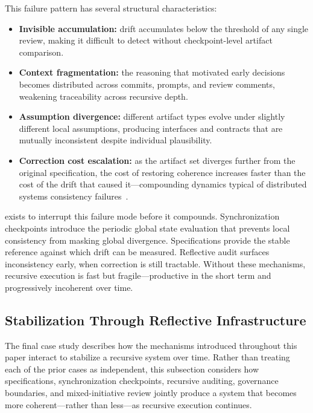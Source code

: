 This failure pattern has several structural characteristics:
\begin{itemize}
  \item \textbf{Invisible accumulation:} drift accumulates below the threshold of any single review, making it difficult to detect without checkpoint-level artifact comparison.
  \item \textbf{Context fragmentation:} the reasoning that motivated early decisions becomes distributed across commits, prompts, and review comments, weakening traceability across recursive depth.
  \item \textbf{Assumption divergence:} different artifact types evolve under slightly different local assumptions, producing interfaces and contracts that are mutually inconsistent despite individual plausibility.
  \item \textbf{Correction cost escalation:} as the artifact set diverges further from the original specification, the cost of restoring coherence increases faster than the cost of the drift that caused it---compounding dynamics typical of distributed systems consistency failures~\cite{Vogels2009EventuallyConsistent,Lamport1978TimeClocks}.
\end{itemize}

 exists to interrupt this failure mode before it compounds. Synchronization checkpoints introduce the periodic global state evaluation that prevents local consistency from masking global divergence. Specifications provide the stable reference against which drift can be measured. Reflective audit surfaces inconsistency early, when correction is still tractable. Without these mechanisms, recursive execution is fast but fragile---productive in the short term and progressively incoherent over time.

\subsection{Stabilization Through Reflective Infrastructure}

The final case study describes how the mechanisms introduced throughout this paper interact to stabilize a recursive system over time. Rather than treating each of the prior cases as independent, this subsection considers how specifications, synchronization checkpoints, recursive auditing, governance boundaries, and mixed-initiative review jointly produce a system that becomes more coherent---rather than less---as recursive execution continues.

